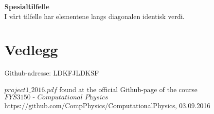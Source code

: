 \documentclass{article}
\begin{document}
\textbf{Spesialtilfelle}\\
I vårt tilfelle har elementene langs diagonalen identisk verdi.





\section{Vedlegg}
Github-adresse: LDKFJLDKSF

%




\begin{thebibliography}{9}

  $project1\_2016.pdf$
  found at the official Github-page of the course $\textit{FYS3150 - Computational Physics}$
  https://github.com/CompPhysics/ComputationalPhysics,
  03.09.2016
  
    
\end{thebibliography}
\end{document}
